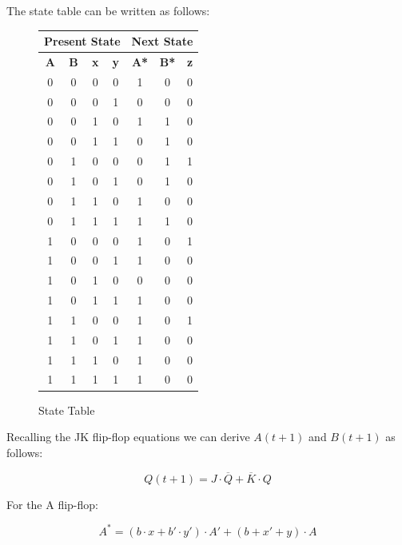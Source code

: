 \documentclass[table ]{article}
\begin{document}
    The state table can be written as follows:

    \begin{figure}[h]
        \centering
        \caption{State Table}
        \begin{tabular}{|c|c|c|c|c|c|c|}
            \hline
            \multicolumn{4}{|c|}{\textbf{Present State}} & \multicolumn{3}{c|}{\textbf{Next State}} \\
            \hline
            \textbf{A} & \textbf{B} & \textbf{x} & \textbf{y} & \textbf{A*} & \textbf{B*} & \textbf{z} \\ 
            \hline
            0 & 0 & 0 & 0 & 1 & 0 & 0 \\
            0 & 0 & 0 & 1 & 0 & 0 & 0 \\
            0 & 0 & 1 & 0 & 1 & 1 & 0 \\
            0 & 0 & 1 & 1 & 0 & 1 & 0 \\
            0 & 1 & 0 & 0 & 0 & 1 & 1 \\
            0 & 1 & 0 & 1 & 0 & 1 & 0 \\
            0 & 1 & 1 & 0 & 1 & 0 & 0 \\
            0 & 1 & 1 & 1 & 1 & 1 & 0 \\
            1 & 0 & 0 & 0 & 1 & 0 & 1 \\
            1 & 0 & 0 & 1 & 1 & 0 & 0 \\
            1 & 0 & 1 & 0 & 0 & 0 & 0 \\
            1 & 0 & 1 & 1 & 1 & 0 & 0 \\
            1 & 1 & 0 & 0 & 1 & 0 & 1 \\
            1 & 1 & 0 & 1 & 1 & 0 & 0 \\
            1 & 1 & 1 & 0 & 1 & 0 & 0 \\
            1 & 1 & 1 & 1 & 1 & 0 & 0 \\
        \hline
        \end{tabular}
    \end{figure}

    Recalling the JK flip-flop equations we can derive  \(A(t+1)\) and \(B(t+1)\) as follows:

    \begin{equation}
        Q(t + 1) = J \cdot \overline{Q} + \overline{K} \cdot Q
    \end{equation}


    For the A flip-flop: 

    \begin{equation}
        A^* = (b \cdot x + b' \cdot y') \cdot A' + (b + x' + y) \cdot A
    \end{equation}
\end{document}
